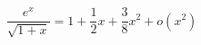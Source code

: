 \begin{displaymath}
  \frac{e^{x}}{\sqrt{1+x}} = 1 + \frac{1}{2}x + \frac{3}{8}x^2 + o(x^2)
\end{displaymath}


